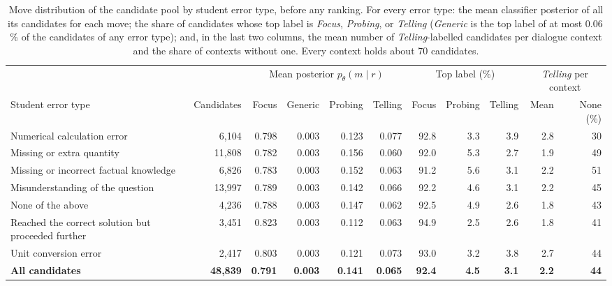 \begin{table}[!t]
    \centering
    \footnotesize
    \setlength{\tabcolsep}{3pt}
    \renewcommand{\arraystretch}{1.08}
    \captionsetup{skip=4pt}
    \begin{tabularx}{\linewidth}{@{}>{\raggedright\arraybackslash}Xrrrrrrrrrr@{}}
        \toprule
        & & \multicolumn{4}{c}{Mean posterior $p_{\theta}(m \mid r)$} & \multicolumn{3}{c}{Top label (\%)} & \multicolumn{2}{c}{\textit{Telling} per context} \\
        \cmidrule(lr){3-6} \cmidrule(lr){7-9} \cmidrule(lr){10-11}
        Student error type & Candidates & Focus & Generic & Probing & Telling & Focus & Probing & Telling & Mean & None (\%) \\
        \midrule
        Numerical calculation error & 6,104 & 0.798 & 0.003 & 0.123 & 0.077 & 92.8 & 3.3 & 3.9 & 2.8 & 30 \\
        Missing or extra quantity & 11,808 & 0.782 & 0.003 & 0.156 & 0.060 & 92.0 & 5.3 & 2.7 & 1.9 & 49 \\
        Missing or incorrect factual knowledge & 6,826 & 0.783 & 0.003 & 0.152 & 0.063 & 91.2 & 5.6 & 3.1 & 2.2 & 51 \\
        Misunderstanding of the question & 13,997 & 0.789 & 0.003 & 0.142 & 0.066 & 92.2 & 4.6 & 3.1 & 2.2 & 45 \\
        None of the above & 4,236 & 0.788 & 0.003 & 0.147 & 0.062 & 92.5 & 4.9 & 2.6 & 1.8 & 43 \\
        Reached the correct solution but proceeded further & 3,451 & 0.823 & 0.003 & 0.112 & 0.063 & 94.9 & 2.5 & 2.6 & 1.8 & 41 \\
        Unit conversion error & 2,417 & 0.803 & 0.003 & 0.121 & 0.073 & 93.0 & 3.2 & 3.8 & 2.7 & 44 \\
        \midrule
        \textbf{All candidates} & \textbf{48,839} & \textbf{0.791} & \textbf{0.003} & \textbf{0.141} & \textbf{0.065} & \textbf{92.4} & \textbf{4.5} & \textbf{3.1} & \textbf{2.2} & \textbf{44} \\
        \bottomrule
    \end{tabularx}
    \caption{Move distribution of the candidate pool by student error type, before any ranking. For every error type: the mean classifier posterior of all its candidates for each move; the share of candidates whose top label is \textit{Focus}, \textit{Probing}, or \textit{Telling} (\textit{Generic} is the top label of at most 0.06\,\% of the candidates of any error type); and, in the last two columns, the mean number of \textit{Telling}-labelled candidates per dialogue context and the share of contexts without one. Every context holds about 70 candidates.}
    \label{tab:candidate_pool}
\end{table}

